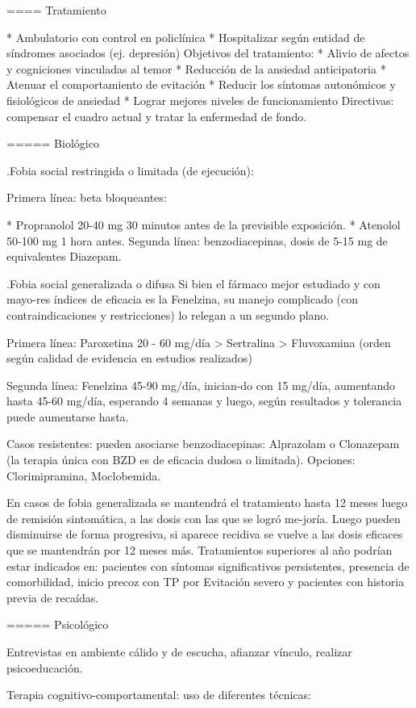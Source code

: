 ==== Tratamiento

* Ambulatorio con control en policlínica
* Hospitalizar según entidad de síndromes asociados (ej. depresión) Objetivos del tratamiento:
* Alivio de afectos y cogniciones vinculadas al temor
* Reducción de la ansiedad anticipatoria
* Atenuar el comportamiento de evitación
* Reducir los síntomas autonómicos y fisiológicos de ansiedad
* Lograr mejores niveles de funcionamiento Directivas: compensar el cuadro actual y tratar la enfermedad de fondo.

===== Biológico

.Fobia social restringida o limitada (de ejecución):

Primera línea: beta bloqueantes:

* Propranolol 20-40 mg 30 minutos antes de la previsible exposición.
* Atenolol 50-100 mg 1 hora antes. Segunda línea: benzodiacepinas, dosis de 5-15 mg de equivalentes Diazepam.

.Fobia social generalizada o difusa
Si bien el fármaco mejor estudiado y con mayo-res índices de eficacia es la Fenelzina, su manejo complicado (con contraindicaciones y restricciones) lo relegan a un segundo plano.

Primera línea: Paroxetina 20 - 60 mg/día > Sertralina > Fluvoxamina (orden según calidad de evidencia en estudios realizados)

Segunda línea: Fenelzina 45-90 mg/día, inician-do con 15 mg/día, aumentando hasta 45-60 mg/día, esperando 4 semanas y luego, según resultados y tolerancia puede aumentarse hasta.

Casos resistentes: pueden asociarse benzodiacepinas: Alprazolam o Clonazepam (la terapia única con BZD es de eficacia dudosa o limitada). Opciones: Clorimipramina, Moclobemida.

En casos de fobia generalizada se mantendrá el tratamiento hasta 12 meses luego de remisión sintomática, a las dosis con las que se logró me-joría. Luego pueden disminuirse de forma progresiva, si aparece recidiva se vuelve a las dosis eficaces que se mantendrán por 12 meses más. Tratamientos superiores al año podrían estar indicados en: pacientes con síntomas significativos persistentes, presencia de comorbilidad, inicio precoz con TP por Evitación severo y pacientes con historia previa de recaídas.

===== Psicológico

Entrevistas en ambiente cálido y de escucha, afianzar vínculo, realizar psicoeducación.

Terapia cognitivo-comportamental: uso de diferentes técnicas:

